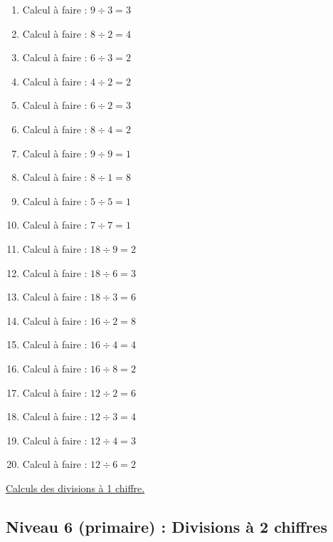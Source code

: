 \documentclass[11pt]{article}
\begin{document}
\begin{enumerate}
\item Calcul à faire :  \(9 \div 3 =  3\)
\item Calcul à faire :  \(8 \div 2 = 4\)
\item Calcul à faire :  \(6 \div 3 = 2\)
\item Calcul à faire :  \(4 \div 2 = 2\)
\item Calcul à faire :  \(6 \div 2 = 3\)
\item Calcul à faire :  \(8 \div 4 = 2\)
\item Calcul à faire :  \(9 \div 9 = 1\)
\item Calcul à faire :  \(8 \div 1 = 8\)
\item Calcul à faire :  \(5 \div 5 = 1\)
\item Calcul à faire :  \(7 \div 7 = 1\)
\item Calcul à faire :  \(18 \div 9 =  2\)
\item Calcul à faire :  \(18 \div 6 = 3\)
\item Calcul à faire :  \(18 \div 3 = 6\)
\item Calcul à faire :  \(16 \div 2 = 8\)
\item Calcul à faire :  \(16 \div 4 = 4\)
\item Calcul à faire :  \(16 \div 8 = 2\)
\item Calcul à faire :  \(12 \div 2 = 6\)
\item Calcul à faire :  \(12 \div 3 = 4\)
\item Calcul à faire :  \(12 \div 4 = 3\)
\item Calcul à faire :  \(12 \div 6 = 2\)
\end{enumerate}




\hyperref[org929aa32]{Calculs des divisions à 1 chiffre.}






\newpage

\subsection{Niveau 6 (primaire) : Divisions à 2 chiffres}
\label{sec:orgaebcc65}
\label{org2dae426}
\end{document}
